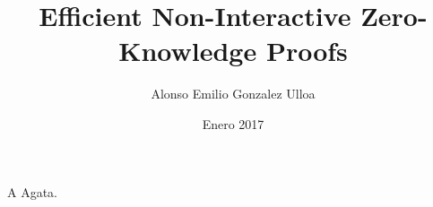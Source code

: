\documentclass[upright, contnum]{umemoria}
\author{Alonso Emilio Gonzalez Ulloa}
\title{Efficient Non-Interactive Zero-Knowledge Proofs}
\date{Enero 2017}
\begin{document}
\frontmatter
\maketitle


\begin{abstract}

\end{abstract}

\begin{dedicatoria} %
A Agata.
\end{dedicatoria}

\begin{thanks} %
\lipsum[1-2]
\end{thanks}
\cleardoublepage

\tableofcontents

\mainmatter


%
%
%
%





\end{document}
